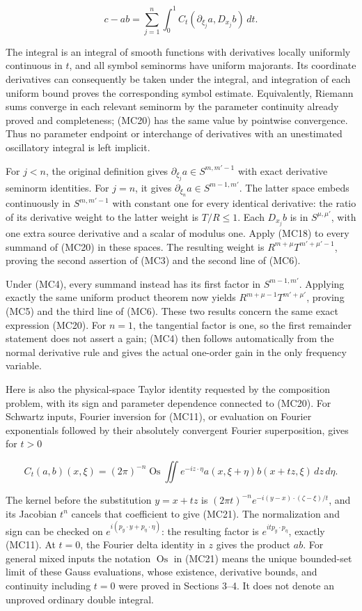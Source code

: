 \documentclass[
  11pt,
]{article}
\begin{document}
\[
c-ab=\sum_{j=1}^n\int_0^1 C_t(\partial_{\xi_j}a,D_{x_j}b)\,dt.
\tag{MC20}
\]

The integral is an integral of smooth functions with derivatives locally
uniformly continuous in \(t\), and all symbol seminorms have uniform
majorants. Its coordinate derivatives can consequently be taken under
the integral, and integration of each uniform bound proves the
corresponding symbol estimate. Equivalently, Riemann sums converge in
each relevant seminorm by the parameter continuity already proved and
completeness; (MC20) has the same value by pointwise convergence. Thus
no parameter endpoint or interchange of derivatives with an unestimated
oscillatory integral is left implicit.

For \(j<n\), the original definition gives
\(\partial_{\xi_j}a\in S^{m,m'-1}\) with exact derivative seminorm
identities. For \(j=n\), it gives \(\partial_{\xi_n}a\in S^{m-1,m'}\).
The latter space embeds continuously in \(S^{m,m'-1}\) with constant one
for every identical derivative: the ratio of its derivative weight to
the latter weight is \(T/R\leq1\). Each \(D_{x_j}b\) is in
\(S^{\mu,\mu'}\), with one extra source derivative and a scalar of
modulus one. Apply (MC18) to every summand of (MC20) in these spaces.
The resulting weight is \(R^{m+\mu}T^{m'+\mu'-1}\), proving the second
assertion of (MC3) and the second line of (MC6).

Under (MC4), every summand instead has its first factor in
\(S^{m-1,m'}\). Applying exactly the same uniform product theorem now
yields \(R^{m+\mu-1}T^{m'+\mu'}\), proving (MC5) and the third line of
(MC6). These two results concern the same exact expression (MC20). For
\(n=1\), the tangential factor is one, so the first remainder statement
does not assert a gain; (MC4) then follows automatically from the normal
derivative rule and gives the actual one-order gain in the only
frequency variable.

Here is also the physical-space Taylor identity requested by the
composition problem, with its sign and parameter dependence connected to
(MC20). For Schwartz inputs, Fourier inversion for (MC11), or evaluation
on Fourier exponentials followed by their absolutely convergent Fourier
superposition, gives for \(t>0\)

\[
C_t(a,b)(x,\xi)=(2\pi)^{-n}
\operatorname{Os}\iint e^{-iz\cdot\eta}
a(x,\xi+\eta)b(x+t z,\xi)\,dz\,d\eta.
\tag{MC21}
\]

The kernel before the substitution \(y=x+t z\) is
\((2\pi t)^{-n}e^{-i(y-x)\cdot(\zeta-\xi)/t}\), and its Jacobian \(t^n\)
cancels that coefficient to give (MC21). The normalization and sign can
be checked on \(e^{i(p_y\cdot y+p_\eta\cdot\eta)}\): the resulting
factor is \(e^{itp_y\cdot p_\eta}\), exactly (MC11). At \(t=0\), the
Fourier delta identity in \(z\) gives the product \(ab\). For general
mixed inputs the notation \(\operatorname{Os}\) in (MC21) means the
unique bounded-set limit of these Gauss evaluations, whose existence,
derivative bounds, and continuity including \(t=0\) were proved in
Sections 3--4. It does not denote an unproved ordinary double integral.
\end{document}
